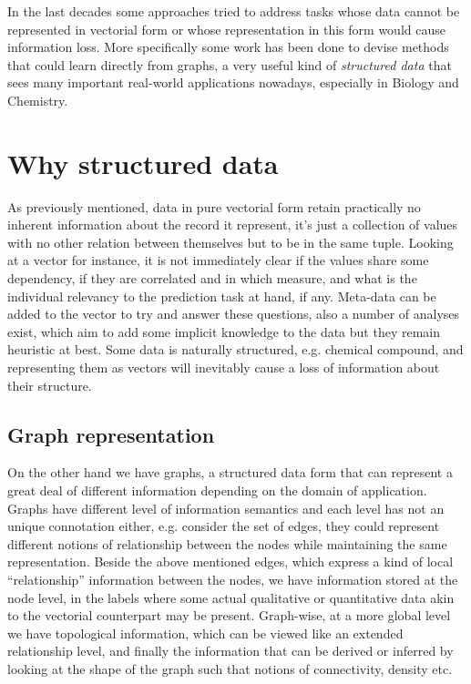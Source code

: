 In the last decades some approaches tried to address tasks whose data cannot
be represented in vectorial form or whose representation in this form would cause
information loss.
More specifically some work has been done to devise methods that could learn
directly from graphs, a very useful kind of \emph{structured data} that sees many
important real-world applications nowadays, especially in Biology and Chemistry.


\section{Why structured data}
As previously mentioned, data in pure vectorial form retain practically no inherent
information about the record it represent, it's just a collection of values with
no other relation between themselves but to be in the same tuple.
Looking at a vector for instance, it is not immediately clear if the values share
some dependency, if they are correlated and in which measure, and what is the
individual relevancy to the prediction task at hand, if any.
Meta-data can be added to the vector to try and answer these questions, also a
number of analyses exist, which aim to add some implicit knowledge to the data
but they remain heuristic at best.
Some data is naturally structured, e.g. chemical compound, and representing them
as vectors will inevitably cause a loss of information about their structure.

\subsection{Graph representation}
On the other hand we have graphs, a structured data form that can represent
a great deal of different information depending on the domain of application.
Graphs have different level of information semantics and each level has not an
unique connotation either, e.g. consider the set of edges, they could represent
different notions of relationship between the nodes while maintaining the same
representation.
Beside the above mentioned edges, which express a kind of local ``relationship''
information between the nodes, we have information stored at the node level, in the
labels where some actual qualitative or quantitative data akin to the vectorial
counterpart may be present.
Graph-wise, at a more global level we have topological information, which can be
viewed like an extended relationship level, and finally the information that can
be derived or inferred by looking at the shape of the graph such that notions
of connectivity, density etc.

